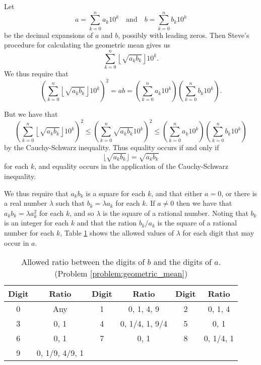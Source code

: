 \documentclass{article}
\begin{document}
\begin{enumerate}[1.]
Let
\[
  a = \sum_{k = 0}^{n} a_k 10^k \quad\text{and}\quad b = \sum_{k = 0}^{n} b_k 10^k
\]
be the decimal expansions of $a$ and $b$, possibly with leading zeros. Then Steve's procedure for calculating the geometric mean gives us
\[
  \sum_{k = 0}^{n} \left\lfloor \sqrt{a_k b_k} \right\rfloor 10^k.
\]
We thus require that
\[
  \left(\sum_{k = 0}^{n} \left\lfloor \sqrt{a_k b_k} \right\rfloor 10^k\right)^2 = ab = \left( \sum_{k = 0}^{n} a_k 10^k \right) \left( \sum_{k = 0}^{n} b_k 10^k \right).
\]

But we have that
\[
  \left(\sum_{k = 0}^{n} \left\lfloor \sqrt{a_k b_k} \right\rfloor 10^k\right)^2 \leq \left( \sum_{k = 0}^{n} \sqrt{a_k b_k} 10^k \right)^2 \leq  \left( \sum_{k = 0}^{n} a_k 10^k \right) \left( \sum_{k = 0}^{n} b_k 10^k \right)
\]
by the Cauchy-Schwarz inequality. Thus equality occurs if and only if 
\[
	\lfloor \sqrt{a_k b_k} \rfloor = \sqrt{a_k b_k}
\] 
for each $k$, and equality occurs in the application of the Cauchy-Schwarz inequality.

We thus require that $a_k b_k$ is a square for each $k$, and that either $a = 0$, or there is a real number $\lambda$ such that $b_k = \lambda a_k$ for each $k$. If $a \neq 0$ then we have that $a_k b_k = \lambda a_k^2$ for each $k$, and so $\lambda$ is the square of a rational number. Noting that $b_k$ is an integer for each $k$ and that the ration $b_k / a_k$ is the square of a rational number for each $k$, Table \ref{tbl:digits} shows the allowed values of $\lambda$ for each digit that may occur in $a$.

\begin{table}
\centering
\caption{Allowed ratio between the digits of $b$ and the digits of $a$. (Problem \ref{problem:geometric_mean})}
\label{tbl:digits}
\begin{tabular}{|c|c|c|c|c|c|}
\hline
  Digit & Ratio & Digit & Ratio & Digit & Ratio \\
\hline
0 & Any & 1 & 0, 1, 4, 9 & 2 & 0, 1, 4 \\
3 & 0, 1 & 4 & 0, 1/4, 1, 9/4 & 5 & 0, 1 \\
6 & 0, 1 & 7 & 0, 1 & 8 & 0, 1/4, 1 \\
9 & 0, 1/9, 4/9, 1 & & & & \\
\hline
\end{tabular}
\end{table}


\end{enumerate}
\end{document}
